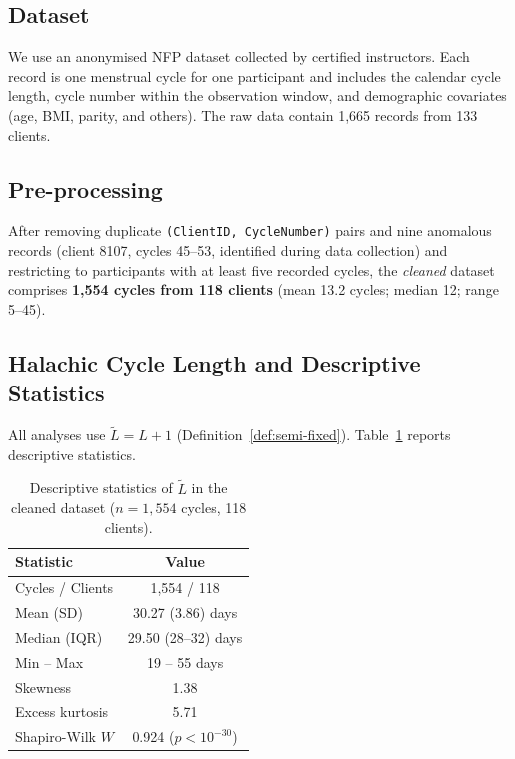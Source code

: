 \documentclass[12pt,a4paper]{article}
\begin{document}
\subsection{Dataset}

We use an anonymised NFP dataset collected by certified instructors.  Each record
is one menstrual cycle for one participant and includes the calendar cycle length,
cycle number within the observation window, and demographic covariates (age, BMI,
parity, and others). The raw data contain 1{,}665 records from 133 clients.

\subsection{Pre-processing}

After removing duplicate \texttt{(ClientID, CycleNumber)} pairs and nine anomalous
records (client 8107, cycles 45--53, identified during data collection) and
restricting to participants with at least five recorded cycles, the \emph{cleaned}
dataset comprises \textbf{1{,}554 cycles from 118 clients} (mean 13.2 cycles;
median 12; range 5--45).

\subsection{Halachic Cycle Length and Descriptive Statistics}

All analyses use $\tilde{L} = L + 1$ (Definition~\ref{def:semi-fixed}).
Table~\ref{tab:descriptives} reports descriptive statistics.

\begin{table}[ht]
\centering
\caption{Descriptive statistics of $\tilde{L}$ in the cleaned dataset
  ($n = 1{,}554$ cycles, 118 clients).}
\label{tab:descriptives}
\begin{tabular}{lc}
\toprule
\textbf{Statistic} & \textbf{Value} \\
\midrule
Cycles / Clients & 1{,}554 / 118 \\
Mean (SD)   & 30.27 (3.86) days \\
Median (IQR)& 29.50 (28--32) days \\
Min -- Max  & 19 -- 55 days \\
Skewness    & 1.38 \\
Excess kurtosis & 5.71 \\
Shapiro-Wilk $W$ & 0.924 ($p < 10^{-30}$) \\
\bottomrule
\end{tabular}
\end{table}
\end{document}
